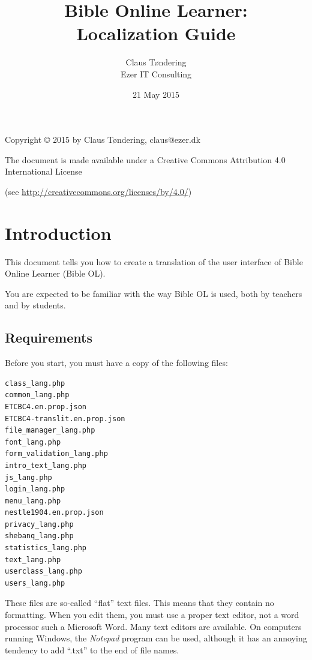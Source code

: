 \documentclass[11pt,oneside,a4paper]{memoir}
\title{Bible Online Learner:\\Localization Guide}
\author{Claus Tøndering\\Ezer IT Consulting}
\date{21 May 2015}
\begin{document}
\begin{titlingpage*}
\maketitle

\begin{center}
Copyright © 2015 by Claus Tøndering, claus@ezer.dk

\vspace{5mm}

The document is made available under a Creative Commons Attribution 4.0 International License

(see \url{http://creativecommons.org/licenses/by/4.0/})
\end{center}
\end{titlingpage*}


\clearpage
\tableofcontents
{} %

\chapter{Introduction}

This document tells you how to create a translation of the user interface of Bible Online Learner
(Bible OL).

You are expected to be familiar with the way Bible OL is used, both by teachers and by students.

\section{Requirements}

Before you start, you must have a copy of the following files:

\begin{verbatim}
class_lang.php
common_lang.php
ETCBC4.en.prop.json
ETCBC4-translit.en.prop.json
file_manager_lang.php
font_lang.php
form_validation_lang.php
intro_text_lang.php
js_lang.php
login_lang.php
menu_lang.php
nestle1904.en.prop.json
privacy_lang.php
shebanq_lang.php
statistics_lang.php
text_lang.php
userclass_lang.php
users_lang.php
\end{verbatim}

These files are so-called ``flat'' text files. This means that they contain no formatting. When you
edit them, you must use a proper text editor, not a word processor such a Microsoft Word. Many text
editors are available. On computers running Windows, the \emph{Notepad} program can be used, although
it has an annoying tendency to add ``.txt'' to the end of file names.
\end{document}
